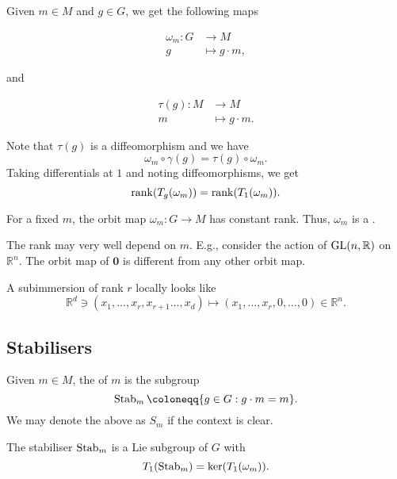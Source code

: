 \documentclass[12pt]{article}
\begin{document}
Given $m \in M$ and $g \in G$, we get the following maps

\begin{align*} 
	\omega_{m} \colon G & \to M \\
	g & \mapsto g \cdot m,
\end{align*}

and

\begin{align*} 
	\tau(g) \colon M & \to M \\
	m & \mapsto g \cdot m.
\end{align*}

Note that $\tau(g)$ is a diffeomorphism and we have
\begin{equation*} 
	\omega_{m} \circ \gamma(g) = \tau(g) \circ \omega_{m}.
\end{equation*}
Taking differentials at $1$ and noting diffeomorphisms, we get
\begin{equation*} 
	\operatorname{rank}(T_{g}(\omega_{m})) = \operatorname{rank}(T_{1}(\omega_{m})).
\end{equation*}

\begin{cor}
	For a fixed $m$, the orbit map $\omega_{m} \colon G \to M$ has constant rank. \newline
	Thus, $\omega_{m}$ is a .
\end{cor}
The rank may very well depend on $m$. 
E.g., consider the action of $\operatorname{GL}(n, \mathbb{R})$ on $\mathbb{R}^{n}$. 
The orbit map of $\mathbf{0}$ is different from any other orbit map.

A subimmersion of rank $r$ locally looks like 
\begin{equation*} 
	\mathbb{R}^{d} \ni (x_{1}, \ldots, x_{r}, x_{r + 1} \ldots, x_{d}) \mapsto (x_{1}, \ldots, x_{r}, 0, \ldots, 0) \in \mathbb{R}^{n}.
\end{equation*}

\subsection{Stabilisers}

Given $m \in M$, the  of $m$ is the subgroup
\begin{equation*} 
	\Stab_{m} \coloneqq \{g \in G : g \cdot m = m\}.
\end{equation*}
We may denote the above as $S_{m}$ if the context is clear.

\begin{thm} \label{thm:stabiliser-subgroup-tangent-space}
	The stabiliser $\operatorname{Stab}_{m}$ is a Lie subgroup of $G$ with
	\begin{equation*} 
		T_{1}(\operatorname{Stab}_{m}) = \ker(T_{1}(\omega_{m})).
	\end{equation*}
\end{thm}
\end{document}

